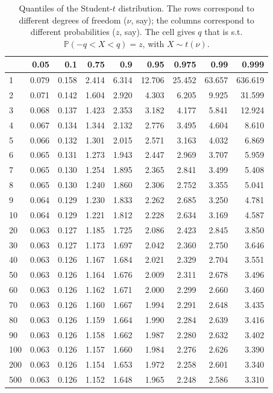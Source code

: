 \documentclass[
]{book}
\theoremstyle{definition}
\theoremstyle{definition}
\theoremstyle{definition}
\theoremstyle{definition}
\theoremstyle{remark}
\begin{document}
\begin{table}

\caption{\label{tab:Student}Quantiles of the Student-$t$ distribution. The rows correspond to different degrees of freedom ($\nu$, say); the columns correspond to different probabilities ($z$, say). The cell gives $q$ that is s.t. $\mathbb{P}(-q<X<q)=z$, with $X \sim t(\nu)$.}
\centering
\begin{tabular}[t]{l|r|r|r|r|r|r|r|r}
\hline
  & 0.05 & 0.1 & 0.75 & 0.9 & 0.95 & 0.975 & 0.99 & 0.999\\
\hline
1 & 0.079 & 0.158 & 2.414 & 6.314 & 12.706 & 25.452 & 63.657 & 636.619\\
\hline
2 & 0.071 & 0.142 & 1.604 & 2.920 & 4.303 & 6.205 & 9.925 & 31.599\\
\hline
3 & 0.068 & 0.137 & 1.423 & 2.353 & 3.182 & 4.177 & 5.841 & 12.924\\
\hline
4 & 0.067 & 0.134 & 1.344 & 2.132 & 2.776 & 3.495 & 4.604 & 8.610\\
\hline
5 & 0.066 & 0.132 & 1.301 & 2.015 & 2.571 & 3.163 & 4.032 & 6.869\\
\hline
6 & 0.065 & 0.131 & 1.273 & 1.943 & 2.447 & 2.969 & 3.707 & 5.959\\
\hline
7 & 0.065 & 0.130 & 1.254 & 1.895 & 2.365 & 2.841 & 3.499 & 5.408\\
\hline
8 & 0.065 & 0.130 & 1.240 & 1.860 & 2.306 & 2.752 & 3.355 & 5.041\\
\hline
9 & 0.064 & 0.129 & 1.230 & 1.833 & 2.262 & 2.685 & 3.250 & 4.781\\
\hline
10 & 0.064 & 0.129 & 1.221 & 1.812 & 2.228 & 2.634 & 3.169 & 4.587\\
\hline
20 & 0.063 & 0.127 & 1.185 & 1.725 & 2.086 & 2.423 & 2.845 & 3.850\\
\hline
30 & 0.063 & 0.127 & 1.173 & 1.697 & 2.042 & 2.360 & 2.750 & 3.646\\
\hline
40 & 0.063 & 0.126 & 1.167 & 1.684 & 2.021 & 2.329 & 2.704 & 3.551\\
\hline
50 & 0.063 & 0.126 & 1.164 & 1.676 & 2.009 & 2.311 & 2.678 & 3.496\\
\hline
60 & 0.063 & 0.126 & 1.162 & 1.671 & 2.000 & 2.299 & 2.660 & 3.460\\
\hline
70 & 0.063 & 0.126 & 1.160 & 1.667 & 1.994 & 2.291 & 2.648 & 3.435\\
\hline
80 & 0.063 & 0.126 & 1.159 & 1.664 & 1.990 & 2.284 & 2.639 & 3.416\\
\hline
90 & 0.063 & 0.126 & 1.158 & 1.662 & 1.987 & 2.280 & 2.632 & 3.402\\
\hline
100 & 0.063 & 0.126 & 1.157 & 1.660 & 1.984 & 2.276 & 2.626 & 3.390\\
\hline
200 & 0.063 & 0.126 & 1.154 & 1.653 & 1.972 & 2.258 & 2.601 & 3.340\\
\hline
500 & 0.063 & 0.126 & 1.152 & 1.648 & 1.965 & 2.248 & 2.586 & 3.310\\
\hline
\end{tabular}
\end{table}
\end{document}
